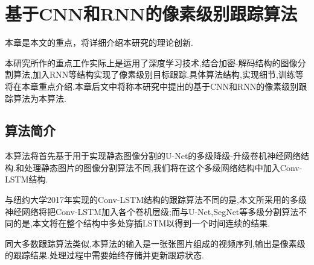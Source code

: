 
\chapter{基于CNN和RNN的像素级别跟踪算法}
本章是本文的重点，将详细介绍本研究的理论创新.
\par
本研究所作的重点工作实际上是运用了深度学习技术,结合加密-解码结构的图像分割算法,加入RNN等结构实现了像素级别目标跟踪.具体算法结构,实现细节,训练等将在本章重点介绍.本章后文中将称本研究中提出的基于CNN和RNN的像素级别跟踪算法为本算法.

\section{算法简介}
本算法将首先基于用于实现静态图像分割的U-Net\supercite{ronneberger2015u}的多级降级-升级卷机神经网络结构.和处理静态图片的图像分割算法不同,我们将在这个多级网络结构中加入Conv-LSTM结构.
\par
与纽约大学2017年实现的Conv-LSTM结构的跟踪算法不同的是,本文所采用的多级神经网络将把Conv-LSTM加入各个卷机层级;而与U-Net,SegNet等多级分割算法不同的是,本文将在整个结构中多处穿插LSTM以得到一个时间连续的结果.
\par
同大多数跟踪算法类似,本算法的输入是一张张图片组成的视频序列,输出是像素级的跟踪结果.处理过程中需要始终存储并更新跟踪状态.

